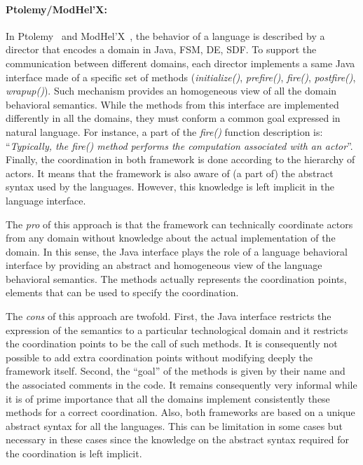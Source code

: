 \paragraph{Ptolemy/ModHel'X: }
In Ptolemy~\cite{ptoleframebib} and ModHel'X~\cite{modhelxbib}, the behavior of a language is described by a director that encodes a domain in Java, \eg FSM, DE, SDF. To support the communication between different domains, each director implements a same Java interface made of a specific set of methods (\eg \emph{initialize()}, \emph{prefire()}, \emph{fire()}, \emph{postfire()}, \emph{wrapup()}). Such mechanism provides an homogeneous view of all the domain behavioral semantics. While the methods from this interface are implemented differently in all the domains, they must conform a common goal expressed in natural language. For instance, a part of the \emph{fire()} function description is: ``\emph{Typically, the fire() method performs the computation associated with an actor}''. Finally, the coordination in both framework is done according to the hierarchy of actors. It means that the framework is also aware of (a part of) the abstract syntax used by the languages. However, this knowledge is left implicit in the language interface.

The \emph{pro} of this approach is that the framework can technically coordinate actors from any domain without knowledge about the actual implementation of the domain. In this sense, the Java interface plays the role of a language behavioral interface by providing an abstract and homogeneous view of the language behavioral semantics. The methods actually represents the coordination points, \ie elements that can be used to specify the coordination. 

The \emph{cons} of this approach are twofold. First, the Java interface restricts the expression of the semantics to a particular technological domain and it restricts the coordination points to be the call of such methods. It is consequently not possible to add extra coordination points without modifying deeply the framework itself. Second, the ``goal'' of the methods is given by their name and the associated comments in the code. It remains consequently very informal while it is of prime importance that all the domains implement consistently these methods for a correct coordination. Also, both frameworks are based on a unique abstract syntax for all the languages. This can be limitation in some cases but necessary in these cases since the knowledge on the abstract syntax required for the coordination is left implicit.
 	
